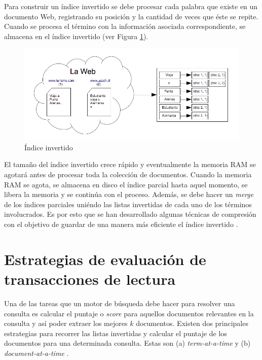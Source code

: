 Para construir un índice invertido \citep{Baeza-Yates:2011, Salton:2003} se debe procesar cada palabra que existe en un documento Web, registrando su posición y la cantidad de veces que éste se repite. Cuando se procesa el término con la información asociada correspondiente, se almacena en el índice invertido (ver Figura \ref{fig:invertedindex}).

\begin{figure}[tp]
\centering
\includegraphics[scale=.75]{images/invertedindex.png}
\caption{\'Indice invertido}
\label{fig:invertedindex}
\end{figure}

El tamaño del índice invertido crece rápido y eventualmente la memoria RAM se agotará antes de procesar toda la colección de documentos. Cuando la memoria RAM se agota, se almacena en disco el índice parcial hasta aquel momento, se libera la memoria y se continúa con el proceso. Además, se debe hacer un \textit{merge} de los índices parciales uniéndo las listas invertidas de cada uno de los términos involucrados. Es por esto que se han desarrollado algunas técnicas de compresión con el objetivo de guardar de una manera más eficiente el índice invertido \citep{Arroyuelo:2013, Baeza-Yates:2011, Yan:2009}.

\section{Estrategias de evaluaci\'on de transacciones de lectura}
\label{marco:eeq}
Una de las tareas que un motor de búsqueda debe hacer para resolver una consulta es calcular el puntaje o \textit{score} para aquellos documentos relevantes en la consulta y así poder extraer los mejores $k$ documentos. Existen dos principales estrategias para recorrer las listas invertidas y calcular el puntaje de los documentos para una determinada consulta. Estas son (a) \textit{term-at-a-time} \citep{Buckley:1985, Turtle:1995} y (b) \textit{document-at-a-time} \citep{Broder:2003, Turtle:1995}.

